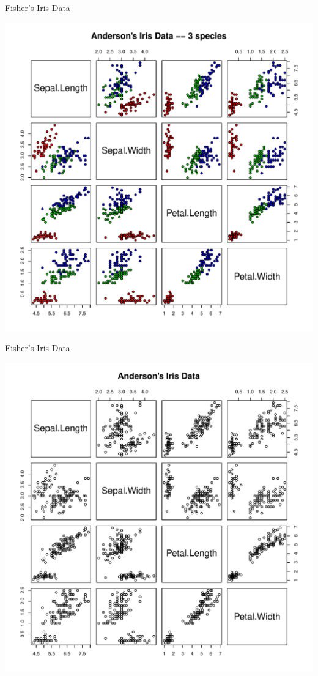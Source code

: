 \documentclass[xcolor=x11names,compress]{beamer}\usepackage[]{graphicx}\usepackage[]{color}
\newenvironment{knitrout}{}{} %
\begin{document}
\begin{frame}{Fisher's Iris Data}
\begin{knitrout}\tiny
{}\color{fgcolor}

{\centering \includegraphics[width=.6\linewidth]{figure/beamer-iris1-1} 

}



\end{knitrout}
\end{frame}


\begin{frame}{Fisher's Iris Data}
\begin{knitrout}\tiny
{}\color{fgcolor}

{\centering \includegraphics[width=.6\linewidth]{figure/beamer-iris2-1} 

}



\end{knitrout}
\end{frame}
\end{document}
